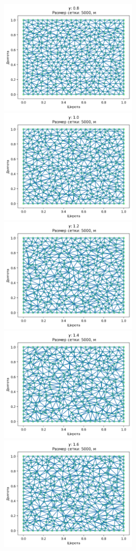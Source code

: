 \includegraphics[width=0.5\textwidth]{images/app1_5.png}
\includegraphics[width=0.5\textwidth]{images/app1_6.png}
\includegraphics[width=0.5\textwidth]{images/app1_7.png}
\includegraphics[width=0.5\textwidth]{images/app1_8.png}
\includegraphics[width=0.5\textwidth]{images/app1_9.png}
